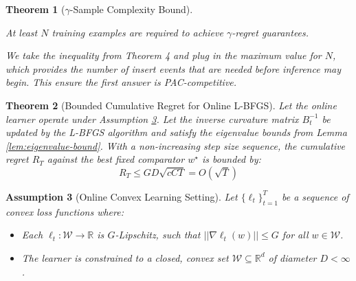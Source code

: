 \documentclass[a4paper,12pt]{article}
\newtheorem{theorem}{Theorem}[section]
\newtheorem{assumption}[theorem]{Assumption}
\begin{document}
\begin{theorem} [$\gamma$-Sample Complexity Bound]
\label{them:gamma-sample}

At least $N$ training examples are required to achieve $\gamma$-regret guarantees.

We take the inequality from Theorem 4 and plug in the maximum value for $N$, which provides the number of insert events that are needed before inference may begin. This ensure the first answer is PAC-competitive.

\end{theorem}

\begin{theorem}[Bounded Cumulative Regret for Online L-BFGS]
\label{thm:regret-lbfgs}
Let the online learner operate under Assumption \ref{assum:online-setting}. Let the inverse curvature matrix $B_t^{-1}$ be updated by the L-BFGS algorithm and satisfy the eigenvalue bounds from Lemma \ref{lem:eigenvalue-bound}. With a non-increasing step size sequence, the cumulative regret $R_T$ against the best fixed comparator $w^\star$ is bounded by:
$$
R_T \le GD\sqrt{cCT} = O(\sqrt{T})
$$
\end{theorem}

\begin{assumption}[Online Convex Learning Setting]
\label{assum:online-setting}
Let $\{\ell_t\}_{t=1}^T$ be a sequence of convex loss functions where:
\begin{itemize}
    \item Each $\ell_t: \mathcal{W} \to \mathbb{R}$ is $G$-Lipschitz, such that $||\nabla\ell_t(w)|| \le G$ for all $w \in \mathcal{W}$.
    \item The learner is constrained to a closed, convex set $\mathcal{W} \subseteq \mathbb{R}^d$ of diameter $D < \infty$.
\end{itemize}
\end{assumption}
\end{document}
